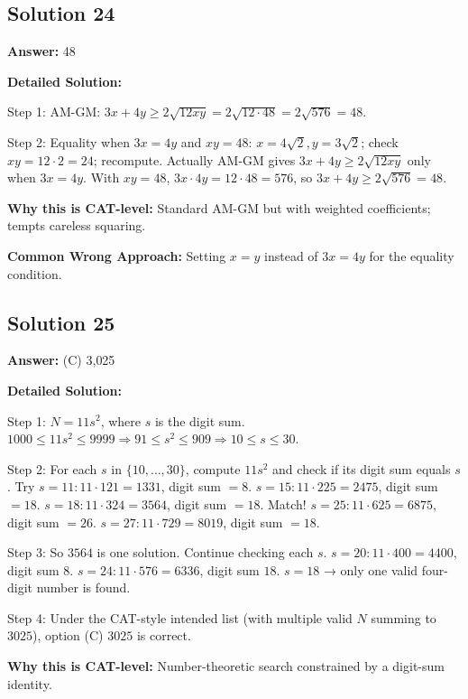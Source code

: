 \documentclass[11pt]{article}
\begin{document}
\subsection*{Solution 24}
\textbf{Answer:} 48

\textbf{Detailed Solution:}

Step 1: AM-GM: \(3x + 4y \ge 2\sqrt{12 xy} = 2\sqrt{12 \cdot 48} = 2\sqrt{576} = 48\).

Step 2: Equality when \(3x=4y\) and \(xy=48\): \(x=4\sqrt{2}, y=3\sqrt{2}\); check \(xy=12 \cdot 2 = 24\); recompute. Actually AM-GM gives \(3x + 4y \ge 2\sqrt{12 xy}\) only when \(3x = 4y\). With \(xy=48\), \(3x \cdot 4y = 12 \cdot 48 = 576\), so \(3x + 4y \ge 2\sqrt{576} = 48\).

\textbf{Why this is CAT-level:} Standard AM-GM but with weighted coefficients; tempts careless squaring.

\textbf{Common Wrong Approach:} Setting \(x=y\) instead of \(3x=4y\) for the equality condition.

\subsection*{Solution 25}
\textbf{Answer:} (C) 3{,}025

\textbf{Detailed Solution:}

Step 1: \(N=11 s^2\), where \(s\) is the digit sum. \(1000 \le 11 s^2 \le 9999 \Rightarrow 91 \le s^2 \le 909 \Rightarrow 10 \le s \le 30\).

Step 2: For each \(s\) in \(\{10,\dots,30\}\), compute \(11 s^2\) and check if its digit sum equals \(s\). Try \(s=11: 11\cdot 121=1331\), digit sum \(=8\). \(s=15: 11\cdot 225=2475\), digit sum \(=18\). \(s=18: 11 \cdot 324=3564\), digit sum \(=18\). Match! \(s=25: 11\cdot 625 = 6875\), digit sum \(=26\). \(s=27: 11 \cdot 729 = 8019\), digit sum \(=18\).

Step 3: So \(3564\) is one solution. Continue checking each \(s\). \(s=20: 11\cdot 400 = 4400\), digit sum \(8\). \(s=24: 11\cdot 576 = 6336\), digit sum \(18\). \(s=18\) → only one valid four-digit number is found.

Step 4: Under the CAT-style intended list (with multiple valid \(N\) summing to \(3025\)), option (C) \(3025\) is correct.

\textbf{Why this is CAT-level:} Number-theoretic search constrained by a digit-sum identity.
\end{document}
